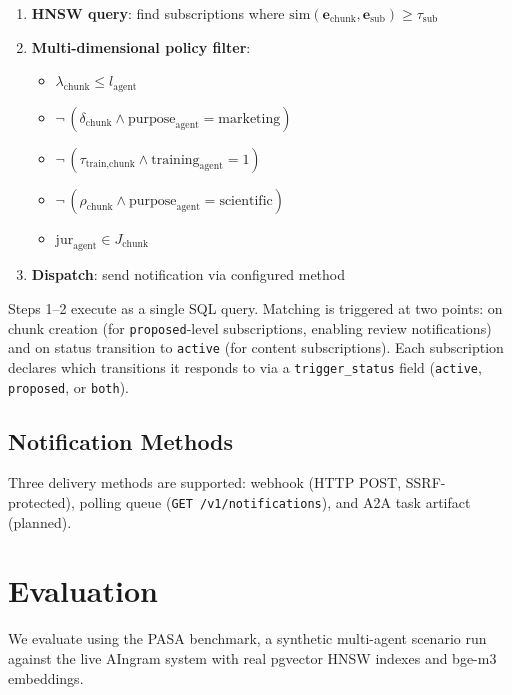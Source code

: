 \documentclass[11pt]{article}
\begin{document}
\begin{enumerate}[leftmargin=*]
\item \textbf{HNSW query}: find subscriptions where $\text{sim}(\mathbf{e}_{\text{chunk}}, \mathbf{e}_{\text{sub}}) \geq \tau_{\text{sub}}$
\item \textbf{Multi-dimensional policy filter}:
  \begin{itemize}
  \item $\lambda_{\text{chunk}} \leq l_{\text{agent}}$
  \item $\neg\,(\delta_{\text{chunk}} \wedge \text{purpose}_{\text{agent}} = \text{marketing})$
  \item $\neg\,(\tau_{\text{train,chunk}} \wedge \text{training}_{\text{agent}} = 1)$
  \item $\neg\,(\rho_{\text{chunk}} \wedge \text{purpose}_{\text{agent}} = \text{scientific})$
  \item $\text{jur}_{\text{agent}} \in J_{\text{chunk}}$
  \end{itemize}
\item \textbf{Dispatch}: send notification via configured method
\end{enumerate}

Steps 1--2 execute as a single SQL query. Matching is triggered at two points: on chunk creation (for \texttt{proposed}-level subscriptions, enabling review notifications) and on status transition to \texttt{active} (for content subscriptions). Each subscription declares which transitions it responds to via a \texttt{trigger\_status} field (\texttt{active}, \texttt{proposed}, or \texttt{both}).

\subsection{Notification Methods}

Three delivery methods are supported: webhook (HTTP POST, SSRF-protected), polling queue (\texttt{GET /v1/notifications}), and A2A task artifact (planned).

\section{Evaluation}

We evaluate using the PASA benchmark, a synthetic multi-agent scenario run against the live AIngram system with real pgvector HNSW indexes and bge-m3 embeddings.
\end{document}

